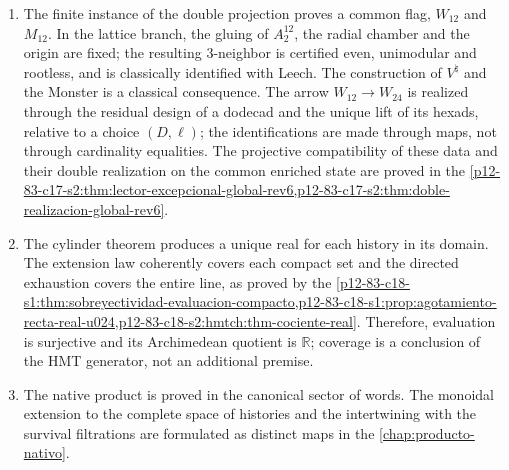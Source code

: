 \begin{enumerate}
\item The finite instance of the double projection proves a common flag,
\(W_{12}\) and \(M_{12}\). In the lattice branch, the gluing of
\(A_2^{12}\), the radial chamber and the origin are fixed; the resulting 3-neighbor is certified
even, unimodular and rootless, and is classically identified with Leech. The
construction of \(V^\natural\) and the Monster is a classical consequence. The
arrow \(W_{12}\to W_{24}\) is realized through the residual design of a
dodecad and the unique lift of its hexads, relative to a choice
\((D,\ell)\); the identifications are made through maps, not
through cardinality equalities. The projective compatibility of these
data and their double realization on the common enriched state are proved
in the
\cref{p12-83-c17-s2:thm:lector-excepcional-global-rev6,p12-83-c17-s2:thm:doble-realizacion-global-rev6}.

\item The cylinder theorem produces a unique real for each history in its
domain. The extension law coherently covers each compact set and the
directed exhaustion covers the entire line, as proved by the
\cref{p12-83-c18-s1:thm:sobreyectividad-evaluacion-compacto,p12-83-c18-s1:prop:agotamiento-recta-real-u024,p12-83-c18-s2:hmtch:thm-cociente-real}.
Therefore, evaluation is surjective and its Archimedean quotient is
\(\mathbb R\); coverage is a conclusion of the HMT generator, not an
additional premise.

\item The native product is proved in the canonical sector of words.
The monoidal extension to the complete space of histories and the intertwining
with the survival filtrations are formulated as distinct maps
in the \cref{chap:producto-nativo}.
\end{enumerate}
